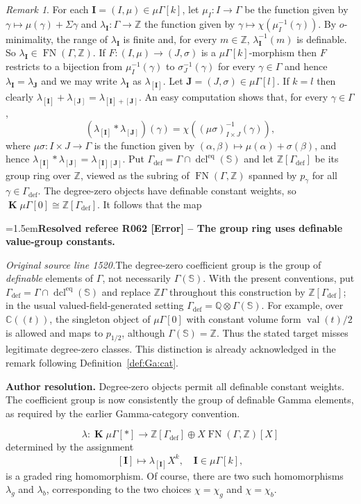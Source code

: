 \documentclass[12pt]{amsart}
\newcommand{\ResolvedRefereeRemark}[5]{%
  \par\medskip\begingroup\normalfont\small\color{gray}%
  \emergencystretch=1.5em\noindent\textbf{Resolved referee R#1 [#2] -- #3.}\par\nobreak\noindent #4\par
  \medskip\color{ResolutionGreen}\noindent\textbf{Author resolution.} #5\par
  \endgroup\medskip
}
\theoremstyle{plain}
\theoremstyle{definition}
\theoremstyle{remark}
\newtheorem{rem}[thm]{Remark}
\numberwithin{equation}{section}
\theoremstyle{plain}
\DeclareMathOperator{\dcl}{dcl}
\newcommand{\Z}{\mathds{Z}}
\newcommand{\omin}{$o$\nobreakdash}
\newcommand{\0}{\emptyset}
\newcommand{\fun}{\longrightarrow}
\newcommand{\efun}{\longmapsto}
\newcommand{\mG}{{\mu}{\Gamma}}
\DeclareMathOperator{\ggk}{\mathbf{K}}
\DeclareMathOperator{\fn}{FN}
\begin{document}
\begin{rem}\label{int:Gam}
For each $\bm I = (I, \mu) \in \mG[k]$, let $\mu_I : I \fun \Gamma$ be the function given by $\gamma \efun \mu(\gamma) + \Sigma\gamma$ and $\lambda_{\bm I} : \Gamma \fun \Z$  the function given by $\gamma \efun \chi(\mu^{-1}_I(\gamma))$. By \omin-minimality, the range of $\lambda_{\bm I}$ is finite and, for every $m \in \Z$, $\lambda_{\bm I}^{-1}(m)$ is definable. So $\lambda_{\bm I} \in \fn(\Gamma, \Z)$. If $F :(I, \mu) \fun (J, \sigma)$ is a $\mG[k]$-morphism then $F$ restricts to a bijection from $\mu^{-1}_I(\gamma)$ to $\sigma_J^{-1}(\gamma)$ for every $\gamma \in \Gamma$ and hence $\lambda_{\bm I} = \lambda_{\bm J}$ and we may write $\lambda_{\bm I}$ as $\lambda_{[\bm I]}$. Let $\bm J = (J, \sigma) \in \mG[l]$. If $k=l$ then clearly $\lambda_{[\bm I]} + \lambda_{[\bm J]} = \lambda_{[\bm I]+[\bm J]}$. An easy computation shows that, for every $\gamma \in \Gamma$,
\[
(\lambda_{[\bm I]} * \lambda_{[\bm J]})(\gamma) = \chi( (\mu \sigma)^{-1}_{I \times J}(\gamma)),
\]
where $\mu \sigma : I \times J \fun \Gamma$ is the function given by $(\alpha, \beta) \efun \mu(\alpha) + \sigma(\beta)$, and hence $\lambda_{[\bm I]} * \lambda_{[\bm J]} = \lambda_{[\bm I][\bm J]}$. Put $\Gamma_{\mathrm{def}}=\Gamma\cap\dcl^{\mathrm{eq}}(\mathbb S)$ and let $\Z[\Gamma_{\mathrm{def}}]$ be its group ring over $\Z$, viewed as the subring of $\fn(\Gamma,\Z)$ spanned by $p_\gamma$ for all $\gamma\in\Gamma_{\mathrm{def}}$. The degree-zero objects have definable constant weights, so $\ggk\mG[0]\cong\Z[\Gamma_{\mathrm{def}}]$. It follows that the map

\ResolvedRefereeRemark{062}{Error}{The group ring uses definable value-group constants}{%
\textit{Original source line 1520.}\quad The degree-zero coefficient group is the group of \emph{definable} elements of $\Gamma$, not necessarily $\Gamma(\mathbb S)$. With the present conventions, put $\Gamma_{\mathrm{def}}=\Gamma\cap\dcl^{\mathrm{eq}}(\mathbb S)$ and replace $\mathbb Z\Gamma$ throughout this construction by $\mathbb Z[\Gamma_{\mathrm{def}}]$; in the usual valued-field-generated setting $\Gamma_{\mathrm{def}}=\mathbb Q\otimes\Gamma(\mathbb S)$. For example, over $\mathbb C((t))$, the singleton object of $\mu\Gamma[0]$ with constant volume form $\operatorname{val}(t)/2$ is allowed and maps to $p_{1/2}$, although $\Gamma(\mathbb S)=\mathbb Z$. Thus the stated target misses legitimate degree-zero classes. This distinction is already acknowledged in the remark following Definition~\ref{def:Ga:cat}.
}{Degree-zero objects permit all definable constant weights. The coefficient group is now consistently the group of definable Gamma elements, as required by the earlier Gamma-category convention.}
\[
\lambda : \ggk \mG[*] \fun \Z[\Gamma_{\mathrm{def}}] \oplus X \fn(\Gamma, \Z)[X]
\]
determined by the assignment
\[
[\bm I] \efun \lambda_{[\bm I]}X^k, \quad \bm I \in \mG[k],
\]
is a graded ring homomorphism. Of course, there are two such homomorphisms $\lambda_g$ and $\lambda_b$, corresponding to the two choices $\chi = \chi_{g}$ and $\chi = \chi_{b}$.
\end{rem}
\end{document}
